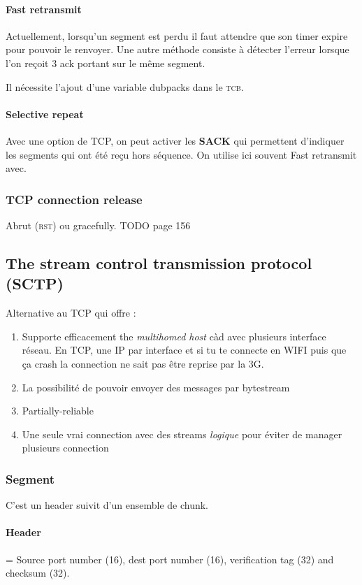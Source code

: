 \paragraph{Fast retransmit}
Actuellement, lorsqu'un segment est perdu il faut attendre que son timer expire
pour pouvoir le renvoyer. Une autre méthode consiste à détecter l'erreur lorsque
l'on reçoit 3 ack portant sur le même segment.

Il nécessite l'ajout d'une variable dubpacks dans le \textsc{tcb}.

\paragraph{Selective repeat}
Avec une option de TCP, on peut activer les \textbf{SACK} qui permettent d'indiquer
les segments qui ont été reçu hors séquence. On utilise ici souvent Fast retransmit avec.

\subsubsection{TCP connection release}
Abrut (\textsc{rst}) ou gracefully.
TODO page 156

\subsection{The stream control transmission protocol (SCTP) }
Alternative au TCP qui offre :
\begin{enumerate}
    \item Supporte efficacement the \textit{multihomed host} càd avec plusieurs interface réseau. En TCP, une IP par interface et si tu te connecte en WIFI puis que ça
        crash la connection ne sait pas être reprise par la 3G.
    \item La possibilité de pouvoir envoyer des messages par bytestream
    \item Partially-reliable
    \item Une seule vrai connection avec des streams \textit{logique} pour éviter de manager
        plusieurs connection
\end{enumerate}

\subsubsection{Segment}
C'est un header suivit d'un ensemble de chunk.

\paragraph{Header} = Source port number (16), dest port number (16), verification tag (32) and checksum (32).

